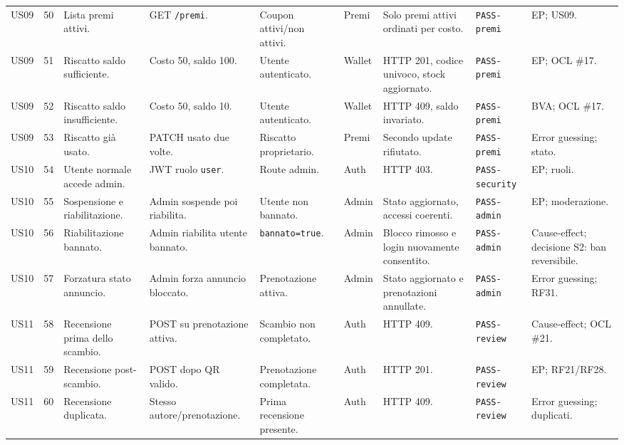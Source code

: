 \documentclass[11pt,a4paper]{article}
\newcommand{\code}[1]{\texttt{#1}}
\begin{document}
\begin{longtable}{L{1.2cm}C{0.45cm}L{2.35cm}L{2.05cm}L{1.95cm}L{0.9cm}L{2.3cm}L{1.55cm}L{2.05cm}}
US09 & 50 & Lista premi attivi. & GET \code{/premi}. & Coupon attivi/non attivi. & Premi & Solo premi attivi ordinati per costo. & \code{PASS-premi} & EP; US09. \\
US09 & 51 & Riscatto saldo sufficiente. & Costo 50, saldo 100. & Utente autenticato. & Wallet & HTTP 201, codice univoco, stock aggiornato. & \code{PASS-premi} & EP; OCL \#17. \\
US09 & 52 & Riscatto saldo insufficiente. & Costo 50, saldo 10. & Utente autenticato. & Wallet & HTTP 409, saldo invariato. & \code{PASS-premi} & BVA; OCL \#17. \\
US09 & 53 & Riscatto già usato. & PATCH usato due volte. & Riscatto proprietario. & Premi & Secondo update rifiutato. & \code{PASS-premi} & Error guessing; stato. \\

US10 & 54 & Utente normale accede admin. & JWT ruolo \code{user}. & Route admin. & Auth & HTTP 403. & \code{PASS-security} & EP; ruoli. \\
US10 & 55 & Sospensione e riabilitazione. & Admin sospende poi riabilita. & Utente non bannato. & Admin & Stato aggiornato, accessi coerenti. & \code{PASS-admin} & EP; moderazione. \\
US10 & 56 & Riabilitazione bannato. & Admin riabilita utente bannato. & \code{bannato=true}. & Admin & Blocco rimosso e login nuovamente consentito. & \code{PASS-admin} & Cause-effect; decisione S2: ban reversibile. \\
US10 & 57 & Forzatura stato annuncio. & Admin forza annuncio bloccato. & Prenotazione attiva. & Admin & Stato aggiornato e prenotazioni annullate. & \code{PASS-admin} & Error guessing; RF31. \\

US11 & 58 & Recensione prima dello scambio. & POST su prenotazione attiva. & Scambio non completato. & Auth & HTTP 409. & \code{PASS-review} & Cause-effect; OCL \#21. \\
US11 & 59 & Recensione post-scambio. & POST dopo QR valido. & Prenotazione completata. & Auth & HTTP 201. & \code{PASS-review} & EP; RF21/RF28. \\
US11 & 60 & Recensione duplicata. & Stesso autore/prenotazione. & Prima recensione presente. & Auth & HTTP 409. & \code{PASS-review} & Error guessing; duplicati. \\


\end{longtable}
\end{document}
